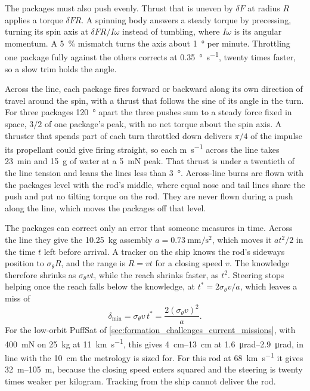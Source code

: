 \documentclass{article}
\begin{document}
The packages must also push evenly. Thrust that is uneven by $\delta F$ at radius $R$ applies a torque $\delta F R$. A spinning body answers a steady torque by precessing, turning its spin axis at $\delta F R/I\omega$ instead of tumbling, where $I\omega$ is its angular momentum. A \SI{5}{\percent} mismatch turns the axis about \SI{1}{\degree} per minute. Throttling one package fully against the others corrects at \SI{0.35}{\degree\per\second}, twenty times faster, so a slow trim holds the angle.

Across the line, each package fires forward or backward along its own direction of travel around the spin, with a thrust that follows the sine of its angle in the turn. For three packages \SI{120}{\degree} apart the three pushes sum to a steady force fixed in space, $3/2$ of one package's peak, with no net torque about the spin axis. A thruster that spends part of each turn throttled down delivers $\pi/4$ of the impulse its propellant could give firing straight, so each \si{\meter\per\second} across the line takes \SI{23}{\minute} and \SI{15}{\gram} of water at a \SI{5}{\milli\newton} peak. That thrust is under a twentieth of the line tension and leans the lines less than \SI{3}{\degree}. Across-line burns are flown with the packages level with the rod's middle, where equal nose and tail lines share the push and put no tilting torque on the rod. They are never flown during a push along the line, which moves the packages off that level.

The packages can correct only an error that someone measures in time. Across the line they give the \SI{10.25}{\kilogram} assembly $a=\SI{0.73}{\milli\meter\per\second\squared}$, which moves it $at^2/2$ in the time $t$ left before arrival. A tracker on the ship knows the rod's sideways position to $\sigma_\theta R$, and the range is $R=vt$ for a closing speed $v$. The knowledge therefore shrinks as $\sigma_\theta v t$, while the reach shrinks faster, as $t^2$. Steering stops helping once the reach falls below the knowledge, at $t^*=2\sigma_\theta v/a$, which leaves a miss of
\begin{equation}\label{eq:funnel_floor}
\delta_{\min}=\sigma_\theta v\,t^* = \frac{2(\sigma_\theta v)^2}{a}.
\end{equation}
For the low-orbit PuffSat of \autoref{sec:formation_challenges_current_missions}, with \SI{400}{\milli\newton} on \SI{25}{\kilogram} at \SI{11}{\kilo\meter\per\second}, this gives \SIrange{4}{13}{\centi\meter} at \SIrange{1.6}{2.9}{\micro\radian}, in line with the \SI{10}{\centi\meter} the metrology is sized for. For this rod at \SI{68}{\kilo\meter\per\second} it gives \SIrange{32}{105}{\meter}, because the closing speed enters squared and the steering is twenty times weaker per kilogram. Tracking from the ship cannot deliver the rod.
\end{document}
